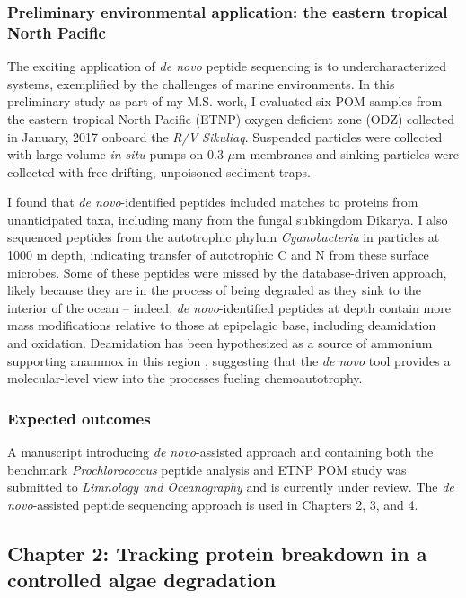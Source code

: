 \documentclass[12pt, letterpaper, twoside]{article}
\begin{document}
\subsubsection{Preliminary environmental application: the eastern tropical North Pacific}

The exciting application of \textit{de novo} peptide sequencing is to undercharacterized systems, exemplified by the challenges of marine environments. In this preliminary study as part of my M.S. work, I evaluated six POM samples from the eastern tropical North Pacific (ETNP) oxygen deficient zone (ODZ) collected in January, 2017 onboard the \textit{R/V Sikuliaq}. Suspended particles were collected with large volume \textit{in situ} pumps on 0.3 $\mu$m membranes and sinking particles were collected with free-drifting, unpoisoned sediment traps.

I found that \textit{de novo}-identified peptides included matches to proteins from unanticipated taxa, including many from the fungal subkingdom Dikarya. I also sequenced peptides from the autotrophic phylum \textit{Cyanobacteria} in particles at 1000 m depth, indicating transfer of autotrophic C and N from these surface microbes. Some of these peptides were missed by the database-driven approach, likely because they are in the process of being degraded as they sink to the interior of the ocean – indeed, \textit{de novo}-identified peptides at depth contain more mass modifications relative to those at epipelagic base, including deamidation and oxidation. Deamidation has been hypothesized as a source of ammonium supporting anammox in this region \cite{van_mooy_impact_2002}, suggesting that the \textit{de novo} tool provides a molecular-level view into the processes fueling chemoautotrophy.

\subsubsection*{Expected outcomes}

A manuscript introducing \textit{de novo}-assisted approach and containing both the  benchmark \textit{Prochlorococcus} peptide analysis and ETNP POM study was submitted to \textit{Limnology and Oceanography} and is currently under review. The \textit{de novo}-assisted peptide sequencing approach is used in Chapters 2, 3, and 4. 

\subsection{Chapter 2: Tracking protein breakdown in a controlled algae degradation}
\end{document}

